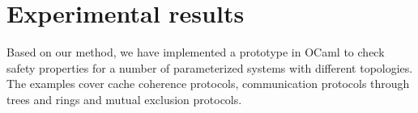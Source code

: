 \section{Experimental results}
\label{section:experiments}
%
Based on our method, we have implemented a prototype in OCaml to check safety properties
for a number of parameterized systems with different topologies. 
%
The examples cover cache coherence protocols, communication protocols
through trees and rings and mutual exclusion protocols.
%

